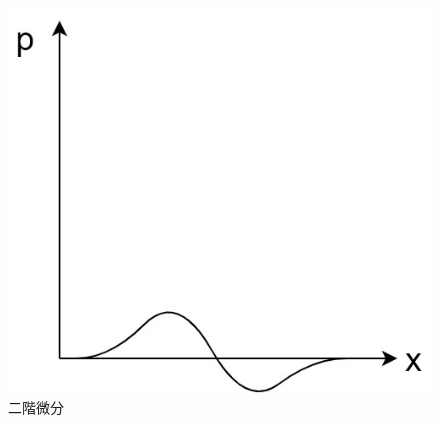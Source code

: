 \documentclass[11pt,a4paper,titlepage,dvipdfmx]{jarticle}
\begin{document}
    \begin{figure}[H]
     \centering
     \includegraphics[scale=.7]{2calc.jpg} 
     \caption{二階微分}
     \label{fig:2calc}
    \end{figure}
\end{document}
